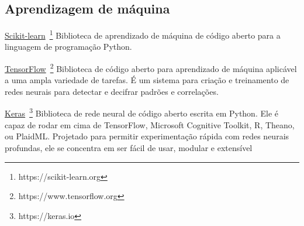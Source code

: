 \subsection*{Aprendizagem de máquina}

\underline{Scikit-learn}~\footnote{https://scikit-learn.org}
Biblioteca de aprendizado de máquina de código aberto para a linguagem de programação Python.

\underline{TensorFlow}~\footnote{https://www.tensorflow.org}
Biblioteca de código aberto para aprendizado de máquina aplicável a uma ampla variedade de tarefas. 
É um sistema para criação e treinamento de redes neurais para detectar e decifrar padrões e correlações.

\underline{Keras}~\footnote{https://keras.io}
Biblioteca de rede neural de código aberto escrita em Python. 
Ele é capaz de rodar em cima de TensorFlow, Microsoft Cognitive Toolkit, R, Theano, ou PlaidML. 
Projetado para permitir experimentação rápida com redes neurais profundas, ele se concentra em ser fácil de usar, modular e extensível
